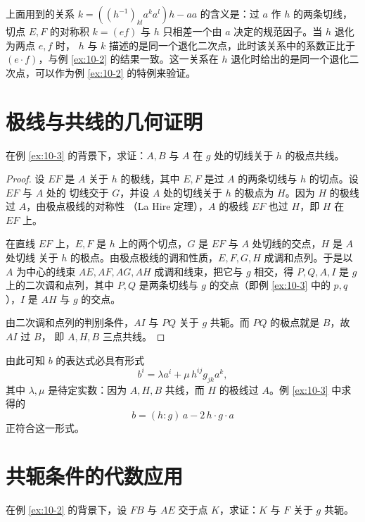 \begin{remark}
上面用到的关系 $k=\left((h^{-1})_{kl}a^ka^l\right)h-aa$ 的含义是：过 $a$ 作 $h$ 的两条切线，
切点 $E,F$ 的对称积 $k=(ef)$ 与 $h$ 只相差一个由 $a$ 决定的规范因子。当 $h$ 退化为两点 $e,f$ 时，
$h$ 与 $k$ 描述的是同一个退化二次点，此时该关系中的系数正比于 $(e\cdot f)$，与例 \ref{ex:10-2}
的结果一致。这一关系在 $h$ 退化时给出的是同一个退化二次点，可以作为例 \ref{ex:10-2} 的特例来验证。
\end{remark}

\section{极线与共线的几何证明}

\begin{example}\label{ex:10-4}
在例 \ref{ex:10-3} 的背景下，求证：$A,B$ 与 $A$ 在 $g$ 处的切线关于 $h$ 的极点共线。
\end{example}

\begin{proof}
设 $EF$ 是 $A$ 关于 $h$ 的极线，其中 $E,F$ 是过 $A$ 的两条切线与 $h$ 的切点。设 $EF$ 与 $A$ 处的
切线交于 $G$，并设 $A$ 处的切线关于 $h$ 的极点为 $H$。因为 $H$ 的极线过 $A$，由极点极线的对称性
（La Hire 定理），$A$ 的极线 $EF$ 也过 $H$，即 $H$ 在 $EF$ 上。

在直线 $EF$ 上，$E,F$ 是 $h$ 上的两个切点，$G$ 是 $EF$ 与 $A$ 处切线的交点，$H$ 是 $A$ 处切线
关于 $h$ 的极点。由极点极线的调和性质，$E,F,G,H$ 成调和点列。于是以 $A$ 为中心的线束
$AE,AF,AG,AH$ 成调和线束，把它与 $g$ 相交，得 $P,Q,A,I$ 是 $g$ 上的二次调和点列，其中
$P,Q$ 是两条切线与 $g$ 的交点（即例 \ref{ex:10-3} 中的 $p,q$），$I$ 是 $AH$ 与 $g$ 的交点。

由二次调和点列的判别条件，$AI$ 与 $PQ$ 关于 $g$ 共轭。而 $PQ$ 的极点就是 $B$，故 $AI$ 过 $B$，
即 $A,H,B$ 三点共线。
\end{proof}

\begin{remark}
由此可知 $b$ 的表达式必具有形式
\[
b^i=\lambda a^i+\mu\,h^{ij}g_{jk}a^k ,
\]
其中 $\lambda,\mu$ 是待定实数：因为 $A,H,B$ 共线，而 $H$ 的极线过 $A$。例 \ref{ex:10-3} 中求得的
\[
b=(h:g)\,a-2\,h\cdot g\cdot a
\]
正符合这一形式。
\end{remark}

\section{共轭条件的代数应用}

\begin{example}\label{ex:10-5}
在例 \ref{ex:10-2} 的背景下，设 $FB$ 与 $AE$ 交于点 $K$，求证：$K$ 与 $F$ 关于 $g$ 共轭。
\end{example}

